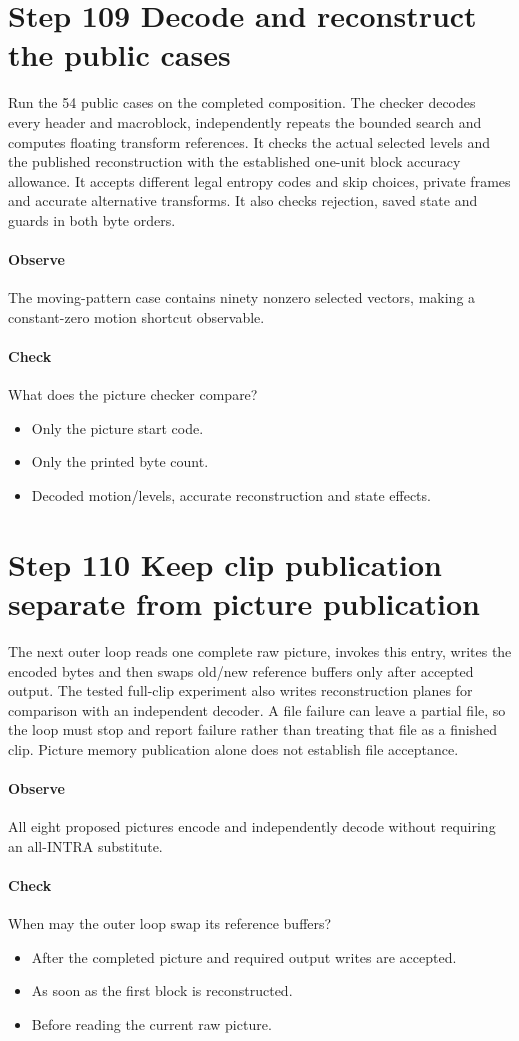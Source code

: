 \section{Step 109 Decode and reconstruct the public cases}\label{h263-picture-s09}
Run the 54 public cases on the completed composition. The checker decodes every
header and macroblock, independently repeats the bounded search and computes
floating transform references. It checks the actual selected levels and the
published reconstruction with the established one-unit block accuracy allowance.
It accepts different legal entropy codes and skip choices, private frames and
accurate alternative transforms. It also checks rejection, saved state and guards
in both byte orders.

\paragraph{Observe} The moving-pattern case contains ninety nonzero selected vectors, making a constant-zero motion shortcut observable.
\paragraph{Check} What does the picture checker compare?
\begin{itemize}
  \item[A.] Only the picture start code.
  \item[B.] Only the printed byte count.
  \item[C.] Decoded motion/levels, accurate reconstruction and state effects.
\end{itemize}

\section{Step 110 Keep clip publication separate from picture publication}\label{h263-picture-s10}
The next outer loop reads one complete raw picture, invokes this entry, writes
the encoded bytes and then swaps old/new reference buffers only after accepted
output. The tested full-clip experiment also writes reconstruction planes for
comparison with an independent decoder. A file failure can leave a partial file,
so the loop must stop and report failure rather than treating that file as a
finished clip. Picture memory publication alone does not establish file acceptance.

\paragraph{Observe} All eight proposed pictures encode and independently decode without requiring an all-INTRA substitute.
\paragraph{Check} When may the outer loop swap its reference buffers?
\begin{itemize}
  \item[A.] After the completed picture and required output writes are accepted.
  \item[B.] As soon as the first block is reconstructed.
  \item[C.] Before reading the current raw picture.
\end{itemize}
